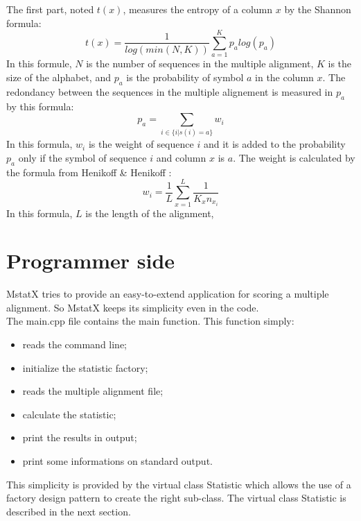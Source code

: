 \documentclass[12pt]{report}
\begin{document}
The first part, noted $t(x)$, measures the entropy of a column $x$ by the Shannon formula:
\begin{equation}
 t(x) = \frac{1}{log(min(N,K))}\sum_{a=1}^{K}p_a log(p_a)
\end{equation}
In this formule, $N$ is the number of sequences in the multiple alignment, $K$ is the size of the alphabet, and $p_a$ is the probability of symbol $a$ in the column $x$. The redondancy between the sequences in the multiple alignement is measured in $p_a$ by this formula:
\begin{equation}
	p_a = \sum_{i \in \{i|s(i) = a\}} w_i
\end{equation}
In this formula, $w_i$ is the weight of sequence $i$ and it is added to the probability $p_a$ only if the symbol of sequence $i$ and column $x$ is $a$. The weight is calculated by the formula from Henikoff \& Henikoff \cite{Henikoff-1994}:
\begin{equation}
	w_i = \frac{1}{L} \sum_{x=1}^{L}\frac{1}{K_x n_{x_i}}
\end{equation}
In this formula, $L$ is the length of the alignment,

\newpage
\section{Programmer side}
\label{prog_sec}
MstatX tries to provide an easy-to-extend application for scoring a multiple alignment.
So MstatX keeps its simplicity even in the code.\\

The main.cpp file contains the main function. This function simply:
\begin{itemize}
\item reads the command line;
\item initialize the statistic factory;
\item reads the multiple alignment file;
\item calculate the statistic;
\item print the results in output;
\item print some informations on standard output.\\
\end{itemize}

This simplicity is provided by the virtual class Statistic which allows the use of a factory design pattern
to create the right sub-class. The virtual class Statistic is described in the next section.
\end{document}
